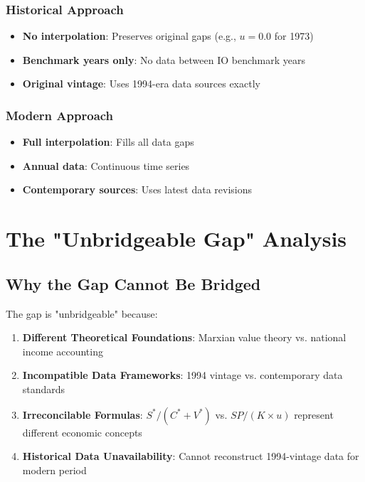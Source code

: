 \documentclass[12pt]{article}
\begin{document}
\subsubsection{Historical Approach}
\begin{itemize}
    \item \textbf{No interpolation}: Preserves original gaps (e.g., $u = 0.0$ for 1973)
    \item \textbf{Benchmark years only}: No data between IO benchmark years
    \item \textbf{Original vintage}: Uses 1994-era data sources exactly
\end{itemize}

\subsubsection{Modern Approach}
\begin{itemize}
    \item \textbf{Full interpolation}: Fills all data gaps
    \item \textbf{Annual data}: Continuous time series
    \item \textbf{Contemporary sources}: Uses latest data revisions
\end{itemize}

\section{The "Unbridgeable Gap" Analysis}

\subsection{Why the Gap Cannot Be Bridged}

\begin{tcolorbox}[colback=orange!5!white,colframe=orange!75!black,title=Fundamental Incompatibility]
The gap is "unbridgeable" because:

\begin{enumerate}
    \item \textbf{Different Theoretical Foundations}: Marxian value theory vs. national income accounting
    \item \textbf{Incompatible Data Frameworks}: 1994 vintage vs. contemporary data standards
    \item \textbf{Irreconcilable Formulas}: $S^*/(C^* + V^*)$ vs. $SP/(K \times u)$ represent different economic concepts
    \item \textbf{Historical Data Unavailability}: Cannot reconstruct 1994-vintage data for modern period
\end{enumerate}
\end{tcolorbox}
\end{document}
